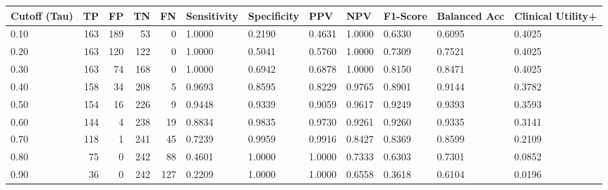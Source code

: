 \begin{tabular}{lrrrrlllllll}
\toprule
Cutoff (Tau) & TP & FP & TN & FN & Sensitivity & Specificity & PPV & NPV & F1-Score & Balanced Acc & Clinical Utility+ \\
\midrule
0.10 & 163 & 189 & 53 & 0 & 1.0000 & 0.2190 & 0.4631 & 1.0000 & 0.6330 & 0.6095 & 0.4025 \\
0.20 & 163 & 120 & 122 & 0 & 1.0000 & 0.5041 & 0.5760 & 1.0000 & 0.7309 & 0.7521 & 0.4025 \\
0.30 & 163 & 74 & 168 & 0 & 1.0000 & 0.6942 & 0.6878 & 1.0000 & 0.8150 & 0.8471 & 0.4025 \\
0.40 & 158 & 34 & 208 & 5 & 0.9693 & 0.8595 & 0.8229 & 0.9765 & 0.8901 & 0.9144 & 0.3782 \\
0.50 & 154 & 16 & 226 & 9 & 0.9448 & 0.9339 & 0.9059 & 0.9617 & 0.9249 & 0.9393 & 0.3593 \\
0.60 & 144 & 4 & 238 & 19 & 0.8834 & 0.9835 & 0.9730 & 0.9261 & 0.9260 & 0.9335 & 0.3141 \\
0.70 & 118 & 1 & 241 & 45 & 0.7239 & 0.9959 & 0.9916 & 0.8427 & 0.8369 & 0.8599 & 0.2109 \\
0.80 & 75 & 0 & 242 & 88 & 0.4601 & 1.0000 & 1.0000 & 0.7333 & 0.6303 & 0.7301 & 0.0852 \\
0.90 & 36 & 0 & 242 & 127 & 0.2209 & 1.0000 & 1.0000 & 0.6558 & 0.3618 & 0.6104 & 0.0196 \\
\bottomrule
\end{tabular}
